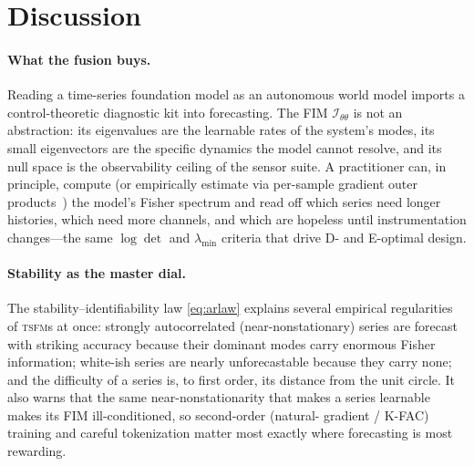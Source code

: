 \documentclass[10pt]{article}
\theoremstyle{plain}
\theoremstyle{definition}
\theoremstyle{remark}
\newcommand{\Fisher}{\mathcal{I}}
\newcommand{\Ith}{\Fisher_{\theta\theta}}
\newcommand{\TSFM}{\textsc{tsfm}}
\begin{document}
\section{Discussion}
\label{sec:discussion}

\paragraph{What the fusion buys.}
Reading a time-series foundation model as an autonomous world model imports a
control-theoretic diagnostic kit into forecasting. The FIM $\Ith$ is not an
abstraction: its eigenvalues are the learnable rates of the system's modes, its
small eigenvectors are the specific dynamics the model cannot resolve, and its
null space is the observability ceiling of the sensor suite. A practitioner can,
in principle, compute (or empirically estimate via per-sample gradient outer
products~\cite[\S12]{wamvla}) the model's Fisher spectrum and read off which
series need longer histories, which need more channels, and which are hopeless
until instrumentation changes---the same $\log\det$ and $\lambda_{\min}$ criteria
that drive D- and E-optimal design.

\paragraph{Stability as the master dial.}
The stability--identifiability law \eqref{eq:arlaw} explains several empirical
regularities of \TSFM s at once: strongly autocorrelated (near-nonstationary)
series are forecast with striking accuracy because their dominant modes carry
enormous Fisher information; white-ish series are nearly unforecastable because
they carry none; and the difficulty of a series is, to first order, its distance
from the unit circle. It also warns that the same near-nonstationarity that makes
a series learnable makes its FIM ill-conditioned, so second-order (natural-%
gradient / K-FAC) training and careful tokenization matter most exactly where
forecasting is most rewarding.
\end{document}

